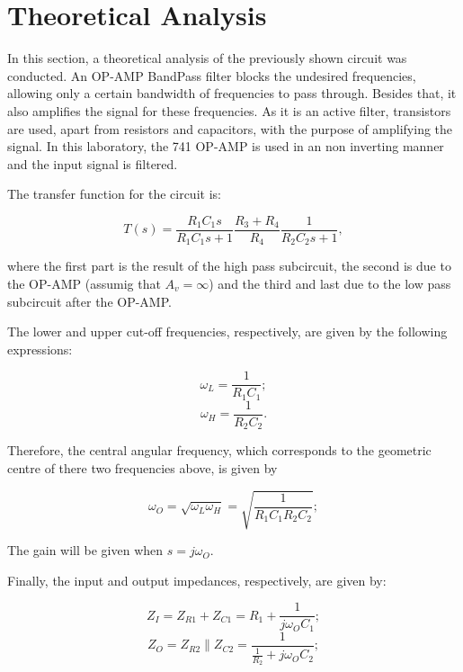 \section{Theoretical Analysis}
\label{sec:analysis}

In this section, a theoretical analysis of the previously shown circuit was conducted. 
An OP-AMP BandPass filter blocks the undesired frequencies, allowing only a certain bandwidth of frequencies to pass through. Besides that, it also amplifies the signal for these frequencies. As it is an active filter, transistors are used, apart from resistors and capacitors, with the purpose of amplifying the signal. In this laboratory, the 741 OP-AMP is used in an non inverting manner and the input signal is filtered.
\par
The transfer function for the circuit is:

\begin{equation}
	T(s) = \frac{R_1C_1s}{R_1C_1s + 1} \frac{R_3+R_4}{R_4} \frac{1}{R_2C_2s + 1},
	\label{eq:T}
\end{equation}

where the first part is the result of the high pass subcircuit, the second is due to the OP-AMP (assumig that $A_v = \infty$) and the third and last due to the low pass subcircuit after the OP-AMP.

The lower and upper cut-off frequencies, respectively, are given by the following expressions:

\begin{equation}
	\omega_L = \frac{1}{R_1C_1};
	\label{eq:WL}
\end{equation}
\begin{equation}
	\omega_H = \frac{1}{R_2C_2}.
	\label{eq:WH}
\end{equation}

Therefore, the central angular frequency, which corresponds to the geometric centre of there two frequencies above, is given by

\begin{equation}
	\omega_O = \sqrt{\omega_L \omega_H} = \sqrt{ \frac{1}{R_1C_1R_2C_2} };
	\label{eq:WO}
\end{equation}

The gain will be given when $s = j\omega_O$.

Finally, the input and output impedances, respectively, are given by:

\begin{equation}
	Z_I = Z_{R1} + Z_{C1} = R_1 + \frac{1}{j \omega_O C_1};
	\label{eq:ZI}
\end{equation}
\begin{equation}
	Z_O = Z_{R2} \parallel Z_{C2} = \frac{1}{\frac{1}{R_2} + j \omega_O C_2};
	\label{eq:ZO}
\end{equation}

